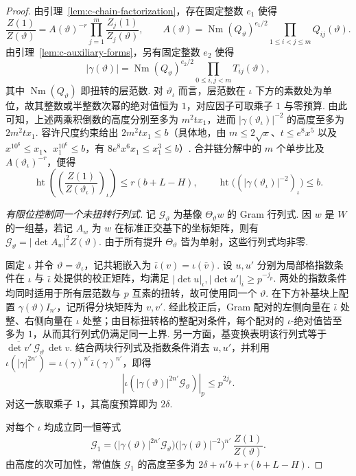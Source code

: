 \begin{proof}
由引理~\ref{lem:c-chain-factorization}，存在固定整数 $e_1$ 使得
\[
 \frac{Z(1)}{Z(\vartheta)}
 =A(\vartheta)^{-r}\prod_{j=1}^{m}\frac{Z_j(1)}{Z_j(\vartheta)},\qquad
 A(\vartheta)=\operatorname{Nm}(Q_\vartheta)^{e_1/2}
                  \prod_{1\le i<j\le m}Q_{ij}(\vartheta).
\]
由引理~\ref{lem:c-auxiliary-forms}，另有固定整数 $e_2$ 使得
\[
 |\gamma(\vartheta)|=\operatorname{Nm}(Q_\vartheta)^{e_2/2}
                   \prod_{0\le i,j<m}T_{ij}(\vartheta),
\]
其中 $\operatorname{Nm}(Q_\vartheta)$ 即扭转的层范数. 对 $\vartheta_\iota$ 而言，层范数在 $\iota$ 下方的素数处为单位，故其整数或半整数次幂的绝对值恒为 $1$，对应因子可取乘子 $1$ 与零预算. 由此可知，上述两乘积倒数的高度分别至多为 $m^2 t x_1$，进而 $|\gamma(\vartheta_\iota)|^{-2}$ 的高度至多为 $2m^2 t x_1$. 容许尺度约束给出 $2m^2tx_1\le b$（具体地，由 $m\le 2\sqrt{x}$、$t\le e^8 x^5$ 以及 $x^{10^6}\le x_1$、$x_1^{10^6}\le b$，有 $8e^8x^6x_1\le x_1^3\le b$）. 合并链分解中的 $m$ 个单步比及 $A(\vartheta_\iota)^{-r}$，便得
\[
 \operatorname{ht}\left(\left(\frac{Z(1)}{Z(\vartheta_\iota)}\right)_\iota\right)
 \le r(b+L-H),\qquad
 \operatorname{ht}\bigl((|\gamma(\vartheta_\iota)|^{-2})_\iota\bigr)\le b.
\]

\emph{有限位控制同一个未扭转行列式.}
记 $\mathcal G_\vartheta$ 为基像 $\Theta_\vartheta w$ 的 Gram 行列式. 因 $w$ 是 $W$ 的一组基，若记 $A_w$ 为 $w$ 在标准正交基下的坐标矩阵，则有 $\mathcal G_\vartheta=|\det A_w|^2 Z(\vartheta)$. 由于所有提升 $\Theta_\vartheta$ 皆为单射，这些行列式均非零.

固定 $\iota$ 并令 $\vartheta=\vartheta_\iota$，记共轭嵌入为 $\bar\iota(v)=\iota(\bar v)$. 设 $u,u'$ 分别为局部格指数条件在 $\iota$ 与 $\bar\iota$ 处提供的校正矩阵，均满足 $|\det u|_\iota,|\det u'|_{\bar\iota}\ge p^{-j_p}$. 两处的指数条件均同时适用于所有层范数与 $p$ 互素的扭转，故可使用同一个 $\vartheta$. 在下方补基块上配置 $\gamma(\vartheta)I_{n'}$，记所得分块矩阵为 $v,v'$. 经此校正后，Gram 配对的左侧向量在 $\bar\iota$ 处整、右侧向量在 $\iota$ 处整；由目标扭转格的整配对条件，每个配对的 $\iota$-绝对值皆至多为 $1$，从而其行列式仍满足同一上界. 另一方面，基变换表明该行列式等于 $\overline{\det v'}\,\mathcal G_\vartheta\,\det v$. 结合两块行列式及指数条件消去 $u,u'$，并利用 $\iota(|\gamma|^{2n'})=\iota(\gamma)^{n'}\bar\iota(\gamma)^{n'}$，即得
\[
 |\iota(|\gamma(\vartheta)|^{2n'}\mathcal G_\vartheta)|_p\le p^{2j_p}.
\]
对这一族取乘子 $1$，其高度预算即为 $2\delta$.

对每个 $\iota$ 均成立同一恒等式
\[
 \mathcal G_1
 =\bigl(|\gamma(\vartheta)|^{2n'}\mathcal G_\vartheta\bigr)
  \bigl(|\gamma(\vartheta)|^{-2}\bigr)^{n'}\,\frac{Z(1)}{Z(\vartheta)} .
\]
由高度的次可加性，常值族 $\mathcal G_1$ 的高度至多为 $2\delta+n'b+r(b+L-H)$.


\end{proof}

